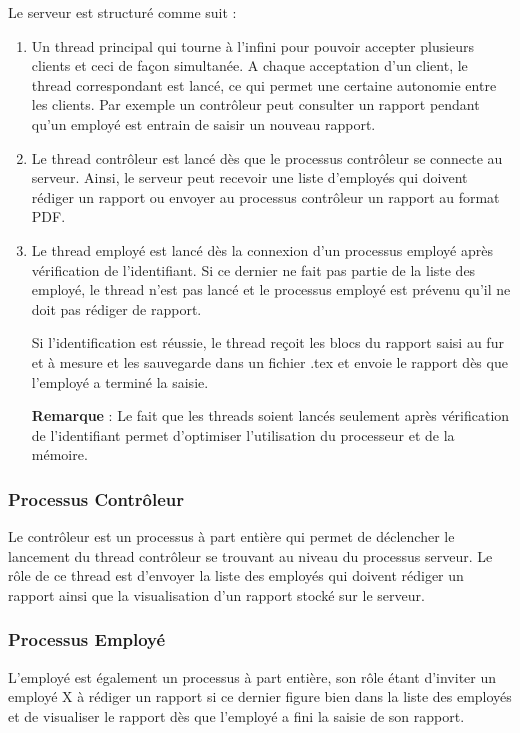 Le serveur est structuré comme suit :
\begin{enumerate}

\item Un thread principal qui tourne à l'infini pour pouvoir accepter plusieurs clients et ceci de façon simultanée. A chaque acceptation d'un client, le thread correspondant est lancé, ce qui  permet une certaine autonomie entre les clients. Par exemple un contrôleur peut consulter un rapport pendant qu'un employé est entrain de saisir un nouveau rapport.
 
\item Le thread contrôleur  est lancé dès que le processus contrôleur se connecte au serveur. Ainsi, le serveur peut recevoir une liste d'employés qui doivent rédiger un rapport ou envoyer au processus contrôleur un rapport au format PDF.

\item Le thread employé est lancé dès la connexion d'un processus employé après vérification de l'identifiant. Si ce dernier ne fait pas partie de la liste des employé, le thread n'est pas lancé et le processus employé est prévenu qu'il ne doit pas rédiger de rapport.

Si l'identification est réussie, le thread reçoit les blocs du rapport saisi au fur et à mesure et les sauvegarde dans un fichier .tex et envoie le rapport dès que l'employé a terminé la saisie.

\textbf{Remarque} : Le fait que les threads soient lancés seulement après vérification de l'identifiant permet d'optimiser l'utilisation du processeur et de la mémoire.
\end{enumerate}

\subsubsection{Processus Contrôleur}
Le contrôleur est un processus à part entière qui permet de déclencher le lancement du thread contrôleur se trouvant au niveau du processus serveur. Le rôle de ce thread est d'envoyer la liste des employés qui doivent rédiger un rapport ainsi que la visualisation d'un rapport stocké sur le serveur. 
\subsubsection{Processus Employé}
L'employé est également un processus à part entière, son rôle étant d'inviter un employé X à rédiger un rapport si ce dernier figure bien dans la liste des employés et de visualiser le rapport dès que l'employé a fini la saisie de son rapport.


